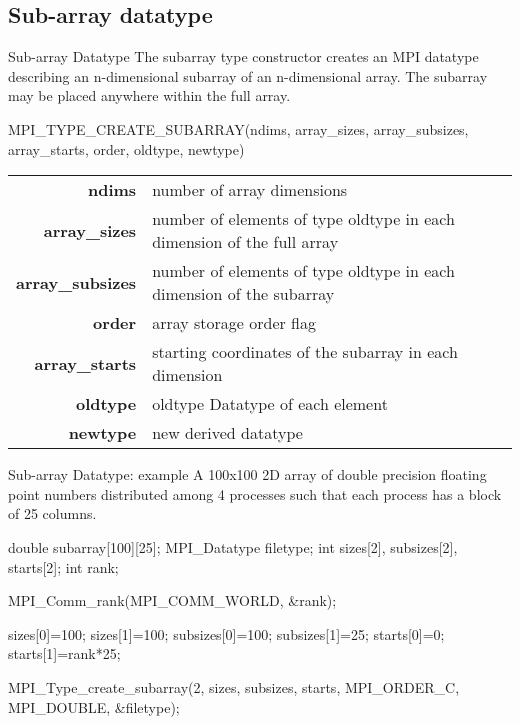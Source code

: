 \documentclass[aspectratio=43]{beamer}
\begin{document}
\subsection{Sub-array datatype}
\begin{frame}[fragile]{Sub-array Datatype}
\justifying
The subarray type constructor creates an MPI datatype describing an n-dimensional subarray of an n-dimensional array. The subarray may be placed anywhere within the full array.
\begin{Cpplisting}[]{}
MPI_TYPE_CREATE_SUBARRAY(ndims, array_sizes, array_subsizes, array_starts, order, oldtype, newtype)
\end{Cpplisting}
\begin{black1block}{}
\begin{tabular}{rp{6.5cm}}
\textbf{ndims} & number of array dimensions\\
\textbf{array\_sizes} & number of elements of type oldtype in each dimension of the full array\\
\textbf{array\_subsizes} & number of elements of type oldtype in each dimension of the subarray\\
\textbf{order} & array storage order flag\\
\textbf{array\_starts} & starting coordinates of the subarray in each dimension\\
\textbf{oldtype} & oldtype Datatype of each element\\
\textbf{newtype} & new derived datatype\\
\end{tabular}
\end{black1block}
\end{frame}

\begin{frame}[fragile]{Sub-array Datatype: example}
A 100x100 2D array of double precision floating point numbers distributed among 4 processes such that each process has a block of 25 columns.

\begin{Cpplisting}[]{}
double subarray[100][25];
MPI_Datatype filetype;
int sizes[2], subsizes[2], starts[2];
int rank;

MPI_Comm_rank(MPI_COMM_WORLD, &rank);

sizes[0]=100; sizes[1]=100;
subsizes[0]=100; subsizes[1]=25;
starts[0]=0; starts[1]=rank*25;

MPI_Type_create_subarray(2, sizes, subsizes, starts, MPI_ORDER_C, MPI_DOUBLE, &filetype);
\end{Cpplisting}

\end{frame}
\end{document}
